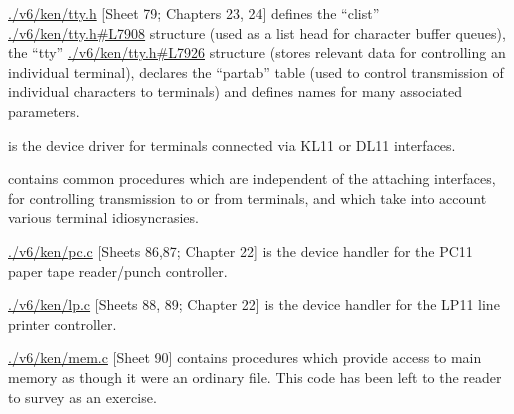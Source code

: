 \bd
\item[tty.h] \url{./v6/ken/tty.h} [Sheet 79; Chapters 23, 24]
defines the ``clist'' \url{./v6/ken/tty.h#L7908} structure (used
as a list head for character buffer
queues), the ``tty'' \url{./v6/ken/tty.h#L7926} structure (stores
relevant data for controlling an
individual terminal), declares the
``partab'' table (used to control
transmission of individual characters 
to terminals) and defines names
for many associated parameters.

\item[kl.c] [Sheet 80; Chapters 24, 25] is
the device driver for terminals connected 
via KL11 or DL11 interfaces.

\item[tty.c] [Sheets 81..85; Chapters 23,
24, 25] contains common procedures
which are independent of the attaching 
interfaces, for controlling
transmission to or from terminals,
and which take into account various
terminal idiosyncrasies.

\item[pc.c] \url{./v6/ken/pc.c} [Sheets 86,87; Chapter 22] is
the device handler for the PC11
paper tape reader/punch controller.

\item[lp.c] \url{./v6/ken/lp.c} [Sheets 88, 89; Chapter 22] is
the device handler for the LP11 line
printer controller.

\item[mem.c] \url{./v6/ken/mem.c} [Sheet 90] contains procedures
which provide access to main memory
as though it were an ordinary file.
This code has been left to the
reader to survey as an exercise.
\ed

